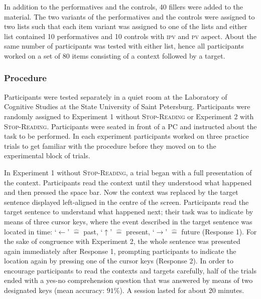 \documentclass[output=paper,
colorlinks,
citecolor=brown,
newtxmath,
hidelinks
]{langscibook}
\begin{document}
\noindent In addition to the performatives and the controls, 40 fillers were added to the material. The two variants of the performatives and the controls were assigned to two lists such that each item variant was assigned to one of the lists and either list contained 10 performatives and 10 controls with \textsc{ipv} and \textsc{pv} aspect. About the same number of participants was tested with either list, hence all participants worked on a set of 80 items consisting of a context followed by a target. 

\subsubsection{Procedure}\label{sct:zwei.eins.drei}

Participants were tested separately in a quiet room at the Laboratory of Cognitive Studies at the State University of Saint Petersburg. Participants were randomly assigned to Experiment 1 without \textsc{Stop-Reading} or Experiment 2 with \textsc{Stop-Reading}. Participants were seated in front of a PC and instructed about the task to be performed. In each experiment participants worked on three practice trials to get familiar with the procedure before they moved on to the experimental block of trials.

In Experiment 1 without \textsc{Stop-Reading}, a trial began with a full presentation of the context. Participants read the context until they understood what happened and then pressed the space bar. Now the context was replaced by the target sentence displayed left-aligned in the centre of the screen. Participants read the target sentence to understand what happened next; their task was to indicate by means of three cursor keys, where the event described in the target sentence was located in time: ‘$\leftarrow$’ $\hat{=}$ past, ‘$\uparrow$’ $\hat{=}$ present, ‘$\rightarrow$’ $\hat{=}$ future (Response 1). For the sake of congruence with Experiment 2, the whole sentence was presented again immediately after Response 1, prompting participants to indicate the location again by pressing one of the cursor keys (Response 2). In order to encourage participants to read the contexts and targets carefully, half of the trials ended with a yes-no comprehension question that was answered by means of two designated keys (mean accuracy: $91\%$). A session lasted for about 20 minutes.
\end{document}
